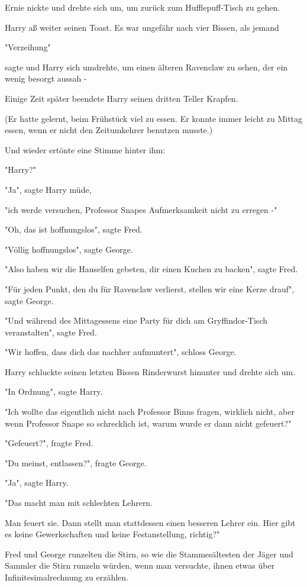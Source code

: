 {Ernie nickte und drehte sich um, um zurück zum Hufflepuff-Tisch zu gehen.

Harry aß weiter seinen Toast. Es war ungefähr nach vier Bissen, als jemand

"Verzeihung"

sagte und Harry sich umdrehte, um einen älteren Ravenclaw zu sehen, der ein wenig besorgt aussah -

Einige Zeit später beendete Harry seinen dritten Teller Krapfen.

(Er hatte gelernt, beim Frühstück viel zu essen. Er konnte immer leicht zu Mittag essen, wenn er nicht den Zeitumkehrer benutzen musste.)

Und wieder ertönte eine Stimme hinter ihm:

"Harry?"

"Ja", sagte Harry müde,

"ich werde versuchen, Professor Snapes Aufmerksamkeit nicht zu erregen -"

"Oh, das ist hoffnungslos", sagte Fred.

"Völlig hoffnungslos", sagte George.

"Also haben wir die Hauselfen gebeten, dir einen Kuchen zu backen", sagte Fred.

"Für jeden Punkt, den du für Ravenclaw verlierst, stellen wir eine Kerze drauf", sagte George.

"Und während des Mittagessens eine Party für dich am Gryffindor-Tisch veranstalten", sagte Fred.

"Wir hoffen, dass dich das nachher aufmuntert", schloss George.

Harry schluckte seinen letzten Bissen Rinderwurst hinunter und drehte sich um.

"In Ordnung", sagte Harry.

"Ich wollte das eigentlich nicht nach Professor Binns fragen, wirklich nicht, aber wenn Professor Snape so schrecklich ist, warum wurde er dann nicht gefeuert?"

"Gefeuert?", fragte Fred.

"Du meinst, entlassen?", fragte George.

"Ja", sagte Harry.

"Das macht man mit schlechten Lehrern.

Man feuert sie. Dann stellt man stattdessen einen besseren Lehrer ein. Hier gibt es keine Gewerkschaften und keine Festanstellung, richtig?"

Fred und George runzelten die Stirn, so wie die Stammesältesten der Jäger und Sammler die Stirn runzeln würden, wenn man versuchte, ihnen etwas über Infinitesimalrechnung zu erzählen.

}
